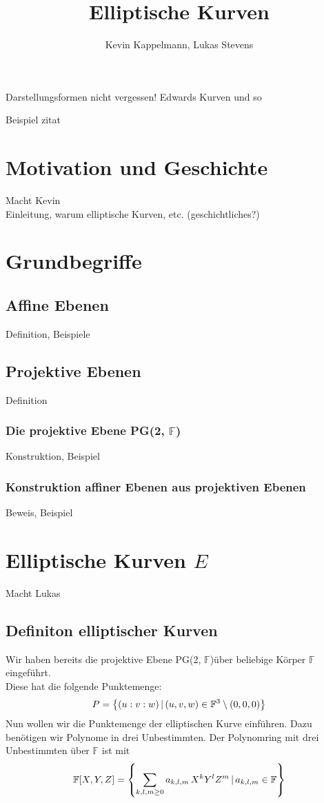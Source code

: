 \documentclass[hidelinks]{article}
\title{Elliptische Kurven}
\author{Kevin Kappelmann, Lukas Stevens}
\newcommand{\pgtwo}{PG(2, $\mathbb{F}$)\thinspace}
\newcommand{\mybar}{\thinspace | \thinspace}
\begin{document}
\maketitle
\newpage
\tableofcontents
\newpage

Darstellungsformen nicht vergessen! Edwards Kurven und so

Beispiel zitat
\cite[Kapitel~5, S.~215]{blablubb}

\section{Motivation und Geschichte}
Macht Kevin\\
Einleitung, warum elliptische Kurven, etc. (geschichtliches?)
\section{Grundbegriffe}
\subsection{Affine Ebenen}
Definition, Beispiele
\subsection{Projektive Ebenen}
Definition
\subsubsection{Die projektive Ebene \pgtwo}
Konstruktion, Beispiel
\subsubsection{Konstruktion affiner Ebenen aus projektiven Ebenen}
Beweis, Beispiel
\section{Elliptische Kurven $E$}
Macht Lukas\\
\subsection{Definiton elliptischer Kurven}
Wir haben bereits die projektive Ebene \pgtwo über beliebige Körper $\mathbb{F}$ eingeführt. \\
Diese hat die folgende Punktemenge:
\begin{equation}
    P = \left\{(u:v:w) \mybar (u,v,w) \in \mathbb{F}^3 \setminus (0,0,0) \right\}
\end{equation}
Nun wollen wir die Punktemenge der elliptischen Kurve einführen. Dazu benötigen wir Polynome in drei Unbestimmten.
Der Polynomring mit drei Unbestimmten über $\mathbb{F}$ ist mit 
\begin{equation}
    \mathbb{F}[X,Y,Z] = \left\{ \sum_{k,l,m \geq 0} a_{k,l,m} \thinspace X^k Y^l Z^m \mybar a_{k,l,m} \in \mathbb{F} \right\}
\end{equation}
\end{document}
